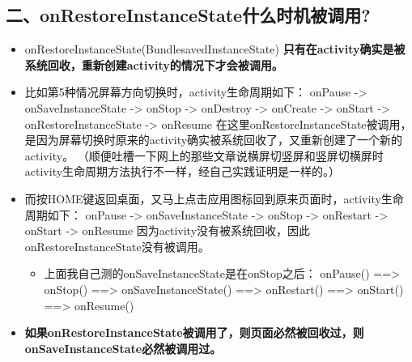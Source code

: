 \documentclass[9pt, b5paper]{article}
\begin{document}
\subsection{二、onRestoreInstanceState什么时机被调用?}
\label{sec-11-2}
\begin{itemize}
\item onRestoreInstanceState(BundlesavedInstanceState) \textbf{只有在activity确实是被系统回收，重新创建activity的情况下才会被调用。}
\item 比如第5种情况屏幕方向切换时，activity生命周期如下： onPause -> onSaveInstanceState -> onStop -> onDestroy -> onCreate -> onStart -> onRestoreInstanceState -> onResume 在这里onRestoreInstanceState被调用，是因为屏幕切换时原来的activity确实被系统回收了，又重新创建了一个新的activity。 （顺便吐槽一下网上的那些文章说横屏切竖屏和竖屏切横屏时activity生命周期方法执行不一样，经自己实践证明是一样的。）
\item 而按HOME键返回桌面，又马上点击应用图标回到原来页面时，activity生命周期如下： onPause -> onSaveInstanceState -> onStop -> onRestart -> onStart -> onResume 因为activity没有被系统回收，因此onRestoreInstanceState没有被调用。
\begin{itemize}
\item 上面我自己测的onSaveInstanceState是在onStop之后： onPause() ==> onStop() ==> onSaveInstanceState() ==> onRestart() ==> onStart() ==> onResume()
\end{itemize}
\item \textbf{如果onRestoreInstanceState被调用了，则页面必然被回收过，则onSaveInstanceState必然被调用过。}
\end{itemize}
\end{document}
